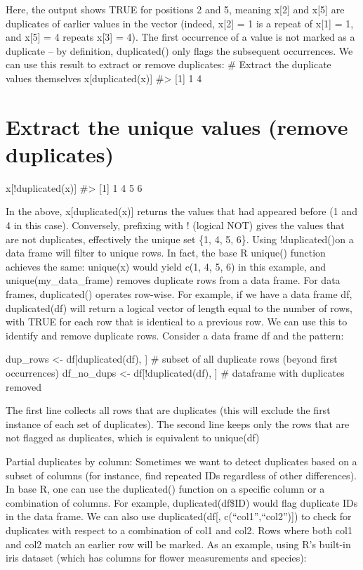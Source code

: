 \documentclass[
  man,
  floatsintext,
  longtable,
  nolmodern,
  notxfonts,
  notimes,
  colorlinks=true,linkcolor=blue,citecolor=blue,urlcolor=blue]{apa7}
\begin{document}
Here, the output shows TRUE for positions 2 and 5, meaning x{[}2{]} and
x{[}5{]} are duplicates of earlier values in the vector (indeed,
x{[}2{]} = 1 is a repeat of x{[}1{]} = 1, and x{[}5{]} = 4 repeats
x{[}3{]} = 4). The first occurrence of a value is not marked as a
duplicate -- by definition, duplicated() only flags the subsequent
occurrences. We can use this result to extract or remove duplicates: \#
Extract the duplicate values themselves x{[}duplicated(x){]}
\#\textgreater{} {[}1{]} 1 4

\section{Extract the unique values (remove
duplicates)}\label{extract-the-unique-values-remove-duplicates}

x{[}!duplicated(x){]} \#\textgreater{} {[}1{]} 1 4 5 6

In the above, x{[}duplicated(x){]} returns the values that had appeared
before (1 and 4 in this case). Conversely, prefixing with ! (logical
NOT) gives the values that are not duplicates, effectively the unique
set \{1, 4, 5, 6\}. Using !duplicated()on a data frame will filter to
unique rows. In fact, the base R unique() function achieves the same:
unique(x) would yield c(1, 4, 5, 6) in this example, and
unique(my\_data\_frame) removes duplicate rows from a data frame. For
data frames, duplicated() operates row-wise. For example, if we have a
data frame df, duplicated(df) will return a logical vector of length
equal to the number of rows, with TRUE for each row that is identical to
a previous row. We can use this to identify and remove duplicate rows.
Consider a data frame df and the pattern:

dup\_rows \textless- df{[}duplicated(df), {]} \# subset of all duplicate
rows (beyond first occurrences) df\_no\_dups \textless-
df{[}!duplicated(df), {]} \# dataframe with duplicates removed

The first line collects all rows that are duplicates (this will exclude
the first instance of each set of duplicates). The second line keeps
only the rows that are not flagged as duplicates, which is equivalent to
unique(df)

Partial duplicates by column: Sometimes we want to detect duplicates
based on a subset of columns (for instance, find repeated IDs regardless
of other differences). In base R, one can use the duplicated() function
on a specific column or a combination of columns. For example,
duplicated(df\$ID) would flag duplicate IDs in the data frame. We can
also use duplicated(df{[}, c(``col1'',``col2''){]}) to check for
duplicates with respect to a combination of col1 and col2. Rows where
both col1 and col2 match an earlier row will be marked. As an example,
using R's built-in iris dataset (which has columns for flower
measurements and species):
\end{document}
